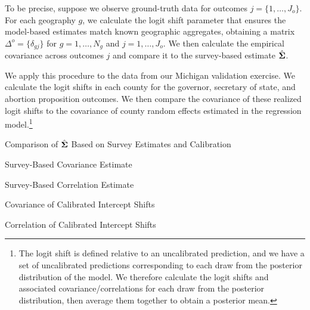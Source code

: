 To be precise, suppose we observe ground-truth data for outcomes $j = \{1, \dots, J_o\}$. For each geography $g$, we calculate the logit shift parameter that ensures the model-based estimates match known geographic aggregates, obtaining a matrix $\Delta^o = \{\delta_{gj}\}$ for ${g=1, \dots, N_g}$ and ${j = 1, \dots, J_o}$.  We then calculate the empirical covariance across outcomes $j$ and compare it to the survey-based estimate $\hat{\mbf{\Sigma}}$.

We apply this procedure to the data from our Michigan validation exercise. We calculate the logit shifts in each county for the governor, secretary of state, and abortion proposition outcomes. We then compare the covariance of these realized logit shifts to the covariance of county random effects estimated in the regression model.\footnote{The logit shift is defined relative to an uncalibrated prediction, and we have a set of uncalibrated predictions corresponding to each draw from the posterior distribution of the model. We therefore calculate the logit shifts and associated covariance/correlations for each draw from the posterior distribution, then average them together to obtain a posterior mean.}






 \begin{table}[tbh]
 		\centering
 		\caption{Comparison of $\hat{\mbf{\Sigma}}$ Based on Survey Estimates and Calibration}
 		\label{tab:validate-covariance}
		\begin{subtable}[t]{.5\linewidth}
 			\centering
 			\caption{Survey-Based Covariance Estimate}
 			\resizebox{\textwidth}{!}{}
 		\end{subtable}%
 			\begin{subtable}[t]{.5\linewidth}
 			\centering
 			\caption{Survey-Based Correlation Estimate}
 			\resizebox{\textwidth}{!}{}
 		\end{subtable}\vspace{5mm}

 		\begin{subtable}[t]{.5\linewidth}
 			\centering
 			\caption{Covariance of Calibrated Intercept Shifts}
 			\resizebox{\textwidth}{!}{}
 		\end{subtable}%
 		\begin{subtable}[t]{.5\linewidth}
 			\centering
 			\caption{Correlation of Calibrated Intercept Shifts}
 			\resizebox{\textwidth}{!}{}
 		\end{subtable}
 \end{table}

